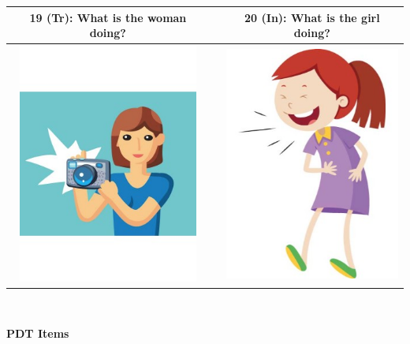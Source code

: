 \documentclass[12pt,notitlepage]{article}
\begin{document}
\begin{center}
\begin{tabular}{|c|c|c|}
\hline
19 (Tr): What is the woman doing? && 20 (In): What is the girl doing? \\
\hline
\includegraphics[width=16em,trim=0 0 0 -3]{figures/I19.jpg} & & \includegraphics[width=16em,trim=0 0 0 -3]{figures/I20.jpg} \\
\hline
\end{tabular}
\vspace{1em} \\


\clearpage

{\Large \textbf{PDT Items}}

\vspace{2em}


\end{center}
\end{document}
